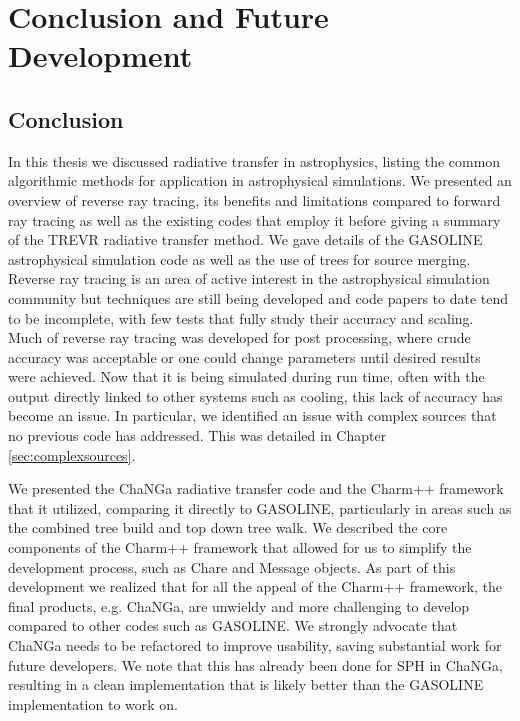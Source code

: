 \chapter{Conclusion and Future Development}

\section{Conclusion}

In this thesis we discussed radiative transfer in astrophysics, listing the common algorithmic methods for application in astrophysical simulations. We presented an overview of reverse ray tracing, its benefits and limitations compared to forward ray tracing as well as the existing codes that employ it before giving a summary of the TREVR radiative transfer method. We gave details of the GASOLINE astrophysical simulation code as well as the use of trees for source merging. Reverse ray tracing is an area of active interest in the astrophysical simulation community but techniques are still being developed and code papers to date tend to be incomplete, with few tests that fully study their accuracy and scaling. Much of reverse ray tracing was developed for post processing, where crude accuracy was acceptable or one could change parameters until desired results were achieved. Now that it is being simulated during run time, often with the output directly linked to other systems such as cooling, this lack of accuracy has become an issue. In particular, we identified an issue with complex sources that no previous code has addressed. This was detailed in Chapter \ref{sec:complexsources}.

We presented the ChaNGa radiative transfer code and the Charm++ framework that it utilized, comparing it directly to GASOLINE, particularly in areas such as the combined tree build and top down tree walk. We described the core components of the Charm++ framework that allowed for us to simplify the development process, such as Chare and Message objects. As part of this development we realized that for all the appeal of the Charm++ framework, the final products, e.g. ChaNGa, are unwieldy and more challenging to develop compared to other codes such as GASOLINE. We strongly advocate that ChaNGa needs to be refactored to improve usability, saving substantial work for future developers. We note that this has already been done for SPH in ChaNGa, resulting in a clean implementation that is likely better than the GASOLINE implementation to work on.

